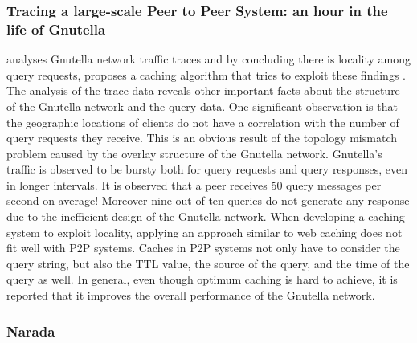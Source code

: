 \subsubsection{Tracing a large-scale Peer to Peer System: an hour in the
life
of Gnutella}
\cite{Markatos02} analyses Gnutella network traffic traces and by concluding
there is locality among query requests, proposes a caching algorithm that tries
to exploit these findings . The analysis of the trace data reveals other
important facts about the structure of the Gnutella network and the query data.
One significant observation is that the geographic locations of clients do not
have a correlation with the number of query requests they receive. This is an
obvious result of the topology mismatch problem caused by the overlay structure
of the Gnutella network. Gnutella's traffic is observed to be bursty both for
query requests and query responses, even in longer intervals. It is observed
that a peer receives 50 query messages per second on average! Moreover nine out
of ten queries do not generate any response due to the inefficient design of
the Gnutella network. When developing a caching system to exploit locality,
applying an approach similar to web caching does not fit well with P2P systems.
Caches in P2P systems not only have to consider the query string, but also
the TTL value, the source of the query, and the time of the query as well.  In
general, even though optimum caching is hard to achieve, it is reported that
it improves the overall performance of the Gnutella network.



\subsubsection{Narada}

